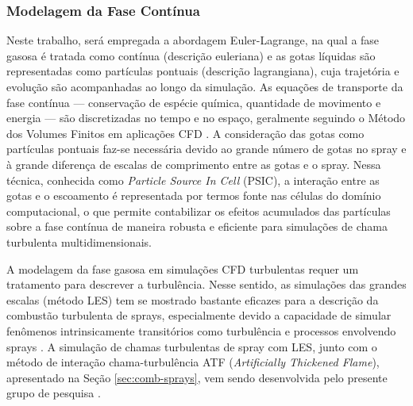 \subsubsection{Modelagem da Fase Contínua} \label{sec:gas}

Neste trabalho, será empregada a abordagem Euler-Lagrange, na qual a fase gasosa é tratada como contínua (descrição euleriana) e as gotas líquidas são representadas como partículas pontuais (descrição lagrangiana), cuja trajetória e evolução são acompanhadas ao longo da simulação. 
As equações de transporte da fase contínua — conservação de espécie química, quantidade de movimento e energia — são discretizadas no tempo e no espaço, geralmente seguindo o Método dos Volumes Finitos  em aplicações CFD \cite{Anderson2009}.
A consideração das gotas como partículas pontuais faz-se necessária devido ao grande número de gotas no spray e à grande diferença de escalas de comprimento entre as gotas e o spray.
Nessa técnica, conhecida como \emph{Particle Source In Cell} (PSIC), a interação entre as gotas e o escoamento é representada por termos fonte nas células do domínio computacional, o que permite contabilizar os efeitos acumulados das partículas sobre a fase contínua de maneira robusta e eficiente para simulações de chama turbulenta multidimensionais.

A modelagem da fase gasosa em simulações CFD turbulentas requer um tratamento para descrever a turbulência. 
Nesse sentido, as simulações das grandes escalas (método LES) tem se mostrado bastante eficazes para a descrição da combustão turbulenta de sprays, especialmente devido a capacidade de simular fenômenos intrinsicamente transitórios como turbulência e processos envolvendo sprays \cite{SacomanoF2020CF}.
A simulação de chamas turbulentas de spray com LES, junto com o método de interação chama-turbulência ATF (\emph{Artificially Thickened Flame}), apresentado na Seção \ref{sec:comb-sprays}, vem sendo desenvolvida pelo presente grupo de pesquisa \cite{SacomanoF2017PhD,SacomanoF2017CF,SacomanoF2018CTM,SacomanoF2019Fluids,SacomanoF2020CF}.

